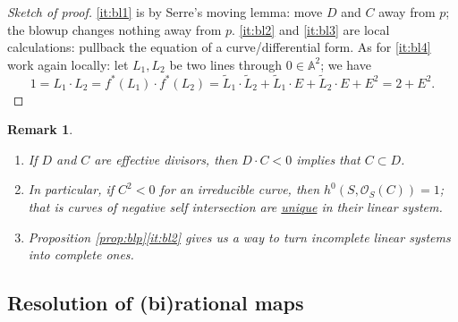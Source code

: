 \documentclass[a4paper,11pt]{amsart}
\newtheorem{remark}[theorem]{Remark}
\newcommand{\OO}{\mathcal{O}}
\renewcommand{\AA}{\mathbb{A}}
\begin{document}
\begin{proof}[Sketch of proof]
	\eqref{it:bl1} is by Serre's moving lemma: move $D$ and $C$ away from $p$; the blowup changes nothing away from $p$.
	\eqref{it:bl2} and \eqref{it:bl3} are local calculations: pullback the equation of a curve/differential form.
	As for \eqref{it:bl4} work again locally: let $L_1, L_2$ be two lines through $0 \in \AA^2$; we have
	\[
	1 = L_1 \cdot L_2 = f^*(L_1)\cdot f^*(L_2) = \tilde{L}_1 \cdot \tilde{L}_2 + \tilde{L}_1 \cdot E + \tilde{L}_2\cdot E + E^2 = 2 + E^2.
	\]
\end{proof}

\begin{remark}\label{rem:negCurves}\leavevmode
	\begin{enumerate}
		\item\label{it:negCurves1} If $D$ and $C$ are effective divisors, then $D\cdot C<0$ implies that $C \subset D$.
		\item\label{it:negCurves2} In particular, if $C^2<0$ for an irreducible curve, then $h^0(S,\OO_S(C)) = 1$;
		that is curves of negative self intersection are \href{https://s-zikas.github.io/site/pics/-1curve.jpg}{unique} in their linear system.
		\item Proposition \ref{prop:blp}\eqref{it:bl2} gives us a way to turn incomplete linear systems into complete ones.
	\end{enumerate}
\end{remark}


\subsection{Resolution of (bi)rational maps}\leavevmode
\end{document}
